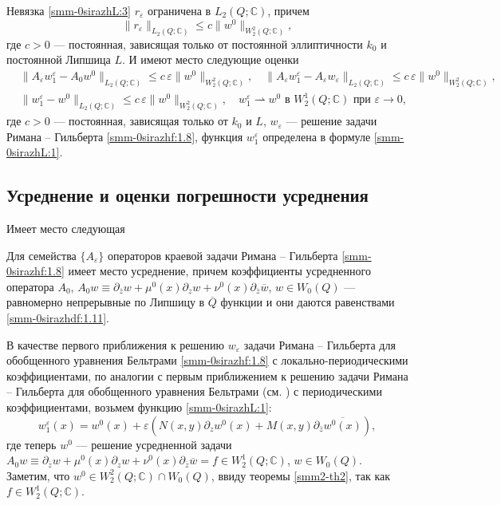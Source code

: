 \begin{lemma} { Невязка \eqref{smm-0sirazhL:3} $r_\varepsilon$ ограничена в $L_2(Q;\mathbb{C})$, причем}
\begin{equation}\label{smm-0sirazhL:0}
	\|r_\varepsilon\|_{L_2(Q;\mathbb{C})}\leqslant c\|w^0\|_{W_2^2(Q;\mathbb{C})},
\end{equation}
{ где $c>0$ --- постоянная, зависящая только от постоянной эллиптичности $k_0$ и постоянной Липшица $L$. И имеют место следующие оценки}
\begin{align}\label{smm-0sirazh4.12}
	&\|A_\varepsilon w_1^\varepsilon-A_0w^0\|_{L_2(Q; \mathbb{C})}\leqslant c\,\varepsilon\|w^0\|_
	{W_2^2 (Q; \mathbb{C})},\quad\|A_\varepsilon w_1^\varepsilon-A_\varepsilon w_\varepsilon\|_{L_2(Q; \mathbb{C})}\leqslant c\,\varepsilon\|w^0\|_
	{W_2^2 (Q; \mathbb{C})},\\
	\label{smm-0sirazh4.13}
	& \|w_1^\varepsilon-w^0\|_{L_2 (Q; \mathbb{C})}\leqslant c\,\varepsilon\|w^0\|_
	{W_2^2 (Q; \mathbb{C})},\quad w_1^\varepsilon\rightharpoonup w^0 \text{\ \ в \ \  } W_2^1(Q;\mathbb{C})\text{\  при \ \ } \varepsilon\to0,
\end{align}
{ где $c>0$ --- постоянная, зависящая только от $k_0$ и $L$,
	$w_\varepsilon$ ---  решение задачи Римана -- Гильберта \eqref{smm-0sirazhf:1.8}, функция
	$w_1^\varepsilon$ определена в формуле \eqref{smm-0sirazhL:1}}.
\end{lemma}



\subsection{Усреднение и оценки погрешности усреднения}

Имеет место  следующая

\begin{theorem} { Для семейства $\{A_\varepsilon\}$ операторов краевой
	задачи Римана -- Гильберта \eqref{smm-0sirazhf:1.8} имеет место усреднение, причем коэффициенты
	усредненного оператора $A_0$, $A_0w\equiv\partial_{\overline{z}}w+\mu^0(x)\partial_zw+\nu^0(x)\partial_{\overline{z}}
	\overline w$, $w\in W_0(Q)$ --- равномерно непрерывные  по Липшицу в $\overline{Q}$ функции и они даются равенствами \eqref{smm-0sirazhdf:1.11}.}
\end{theorem}

В качестве первого приближения к решению $w_\varepsilon$  задачи
Римана -- Гильберта  для обобщенного уравнения Бельтрами \eqref{smm-0sirazhf:1.8} с локально-периодическими коэффициентами, по аналогии с первым приближением к решению  задачи Римана -- Гильберта для обобщенного уравнения Бельтрами (см. \cite{smm-8}) с периодическими коэффициентами, возьмем функцию \eqref{smm-0sirazhL:1}:
$$ w_1^\varepsilon(x)=w^0(x)+\varepsilon\left(N(x,y)\partial_zw^0(x)+M(x,y)\partial_{\bar{z}}\overline{w^0(x)}\right),$$ где теперь $w^0$ --- решение усредненной задачи $A_0w\equiv\partial_{\overline{z}}w+\mu^0(x)\partial_zw+\nu^0(x)\partial_{\overline{z}}
\overline{w}=f\in W_2^1(Q;\mathbb{C})$, $w\in W_0(Q)$. Заметим, что $w^0\in W_2^2(Q;\mathbb{C})\cap W_0(Q)$, ввиду
теоремы \ref{smm2-th2}, так как $f\in W_2^1(Q;\mathbb{C})$.

